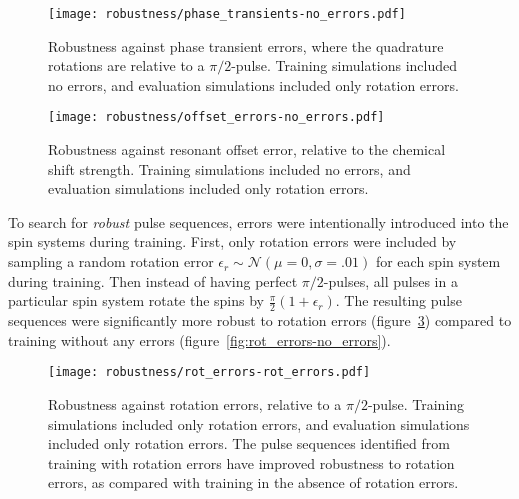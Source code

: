 \begin{figure}[H]
    \centering
    \texttt{[image: robustness/phase\_transients-no\_errors.pdf]}
    \caption{Robustness against phase transient errors, where the quadrature rotations are relative to a $\pi/2$-pulse.
    Training simulations included no errors, and evaluation simulations included only rotation errors.
    }
    \label{fig:phase_transients-no_errors}
\end{figure}


\begin{figure}[H]
    \centering
    \texttt{[image: robustness/offset\_errors-no\_errors.pdf]}
    \caption{Robustness against resonant offset error, relative to the chemical shift strength.
    Training simulations included no errors, and evaluation simulations included only rotation errors.
    }
    \label{fig:offset_errors-no_errors}
\end{figure}



To search for \emph{robust} pulse sequences, errors were intentionally introduced into the spin systems during training. First, only rotation errors were included by sampling a random rotation error $\epsilon_r \sim \mathcal{N}(\mu=0, \sigma=.01)$ for each spin system during training. Then instead of having perfect $\pi/2$-pulses, all pulses in a particular spin system rotate the spins by $\frac{\pi}{2}(1+\epsilon_r)$. The resulting pulse sequences were significantly more robust to rotation errors (figure~\ref{fig:rot_errors-rot_errors})
compared to training without any errors (figure~\ref{fig:rot_errors-no_errors}).

\begin{figure}[H]
    \centering
    \texttt{[image: robustness/rot\_errors-rot\_errors.pdf]}
    \caption{Robustness against rotation errors, relative to a $\pi/2$-pulse.
    Training simulations included only rotation errors, and evaluation simulations included only rotation errors.
    The pulse sequences identified from training with rotation errors have improved robustness to rotation errors, as compared with training in the absence of rotation errors.
    }
    \label{fig:rot_errors-rot_errors}
\end{figure}


